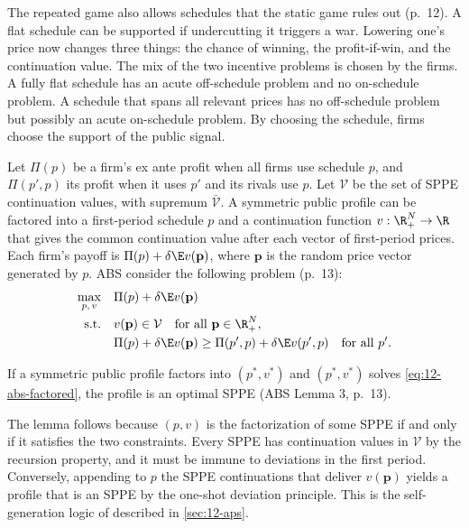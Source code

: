 The repeated game also allows schedules that the static game rules out (p.~12). A flat schedule can be supported if
undercutting it triggers a war. Lowering one's price now changes three things: the chance of winning, the
profit-if-win, and the continuation value. The mix of the two incentive problems is chosen by the firms. A fully flat
schedule has an acute off-schedule problem and no on-schedule problem. A schedule that spans all relevant prices has
no off-schedule problem but possibly an acute on-schedule problem. By choosing the schedule, firms choose the support
of the public signal.

Let $\Pi(p)$ be a firm's ex ante profit when all firms use schedule $p$, and $\Pi(p', p)$ its profit when it uses
$p'$ and its rivals use $p$. Let $\mathcal V$ be the set of SPPE continuation values, with supremum $\bar{\mathcal V}$.
A symmetric public profile can be factored into a first-period schedule $p$ and a continuation function
$v: \R_+^N \to \R$ that gives the common continuation value after each vector of first-period prices. Each firm's
payoff is $\Pi(p) + \delta\E v(\mathbf p)$, where $\mathbf p$ is the random price vector generated by $p$. ABS
consider the following problem (p.~13):
\begin{equation}\label{eq:12-abs-factored}
\begin{aligned}
\max_{p,\,v}\quad & \Pi(p) + \delta\E v(\mathbf p)\\
\text{s.t.}\quad & v(\mathbf p) \in \mathcal V \quad\text{for all } \mathbf p \in \R_+^N,\\
& \Pi(p) + \delta\E v(\mathbf p) \ge \Pi(p', p) + \delta\E v(p', p) \quad\text{for all } p' .
\end{aligned}
\end{equation}

\begin{lemma}[Factorization]\label{lem:12-abs-factor}
If a symmetric public profile factors into $(p^*, v^*)$ and $(p^*, v^*)$ solves \eqref{eq:12-abs-factored}, the
profile is an optimal SPPE (ABS Lemma 3, p.~13).
\end{lemma}

The lemma follows because $(p, v)$ is the factorization of some SPPE if and only if it satisfies the two constraints.
Every SPPE has continuation values in $\mathcal V$ by the recursion property, and it must be immune to deviations in
the first period. Conversely, appending to $p$ the SPPE continuations that deliver $v(\mathbf p)$ yields a profile
that is an SPPE by the one-shot deviation principle. This is the self-generation logic of
\citet{AbreuPearceStacchetti1990} described in \cref{sec:12-aps}.

